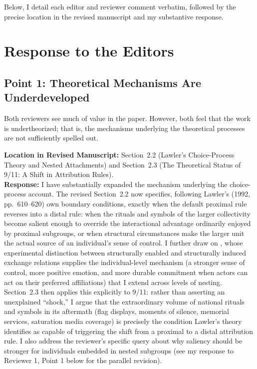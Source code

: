 \documentclass[11pt]{article}
\begin{document}
Below, I detail each editor and reviewer comment verbatim, followed by the precise location in the revised manuscript and my substantive response.

\clearpage

\section*{Response to the Editors}

\subsection*{Point 1: Theoretical Mechanisms Are Underdeveloped}

\begin{reviewercomment}
Both reviewers see much of value in the paper. However, both feel that the work is undertheorized; that is, the mechanisms underlying the theoretical processes are not sufficiently spelled out.
\end{reviewercomment}

\noindent\textbf{Location in Revised Manuscript:} Section~2.2 (Lawler's Choice-Process Theory and Nested Attachments) and Section~2.3 (The Theoretical Status of 9/11: A Shift in Attribution Rules).\\[4pt]
\textbf{Response:} I have substantially expanded the mechanism underlying the choice-process account. The revised Section~2.2 now specifies, following Lawler's (1992, pp.~610--620) own boundary conditions, exactly when the default proximal rule reverses into a distal rule: when the rituals and symbols of the larger collectivity become salient enough to override the interactional advantage ordinarily enjoyed by proximal subgroups, or when structural circumstances make the larger unit the actual source of an individual's sense of control. I further draw on \citet{lawler2006commitment-b3a}, whose experimental distinction between structurally enabled and structurally induced exchange relations supplies the individual-level mechanism (a stronger sense of control, more positive emotion, and more durable commitment when actors can act on their preferred affiliations) that I extend across levels of nesting. Section~2.3 then applies this explicitly to 9/11: rather than asserting an unexplained ``shock,'' I argue that the extraordinary volume of national rituals and symbols in its aftermath (flag displays, moments of silence, memorial services, saturation media coverage) is precisely the condition Lawler's theory identifies as capable of triggering the shift from a proximal to a distal attribution rule. I also address the reviewer's specific query about why saliency should be stronger for individuals embedded in nested subgroups (see my response to Reviewer 1, Point 1 below for the parallel revision).
\end{document}
